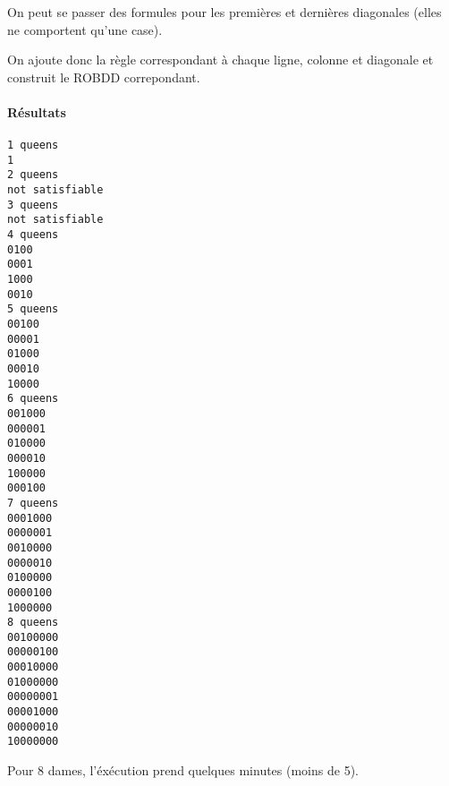 \documentclass[12pt]{article}
\begin{document}
On peut se passer des formules pour les premières et dernières diagonales (elles ne comportent qu'une case).

On ajoute donc la règle correspondant à chaque ligne, colonne et diagonale et construit le ROBDD correpondant.

\paragraph{Résultats}
\begin{lstlisting}
1 queens
1
2 queens
not satisfiable
3 queens
not satisfiable
4 queens
0100
0001
1000
0010
5 queens
00100
00001
01000
00010
10000
6 queens
001000
000001
010000
000010
100000
000100
7 queens
0001000
0000001
0010000
0000010
0100000
0000100
1000000
8 queens
00100000
00000100
00010000
01000000
00000001
00001000
00000010
10000000
\end{lstlisting}

Pour 8 dames, l'éxécution prend quelques minutes (moins de 5).
\end{document}

